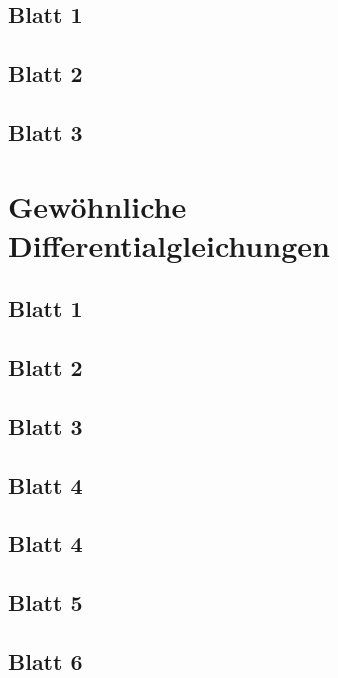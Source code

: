 \documentclass{tuftebook}
\numberwithin{Theorem}{chapter}
\theoremstyle{definition}
\theoremstyle{definition}
\begin{document}
\section{Blatt 1}

\section{Blatt 2}

\section{Blatt 3}


\chapter{Gewöhnliche Differentialgleichungen}
\section{Blatt 1}

\section{Blatt 2}

\section{Blatt 3}

\section{Blatt 4}

\section{Blatt 4}

\section{Blatt 5}

\section{Blatt 6}

\end{document}
